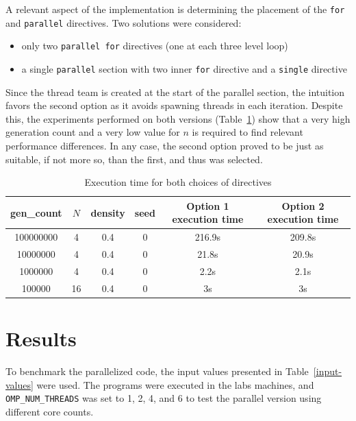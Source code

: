 \documentclass{article}
\begin{document}
A relevant aspect of the implementation is determining the placement of the \texttt{for} and 
\texttt{parallel} directives. Two solutions were considered:

\begin{itemize}
	\itemsep -0.2em
	\item only two \texttt{parallel for} directives (one at each three level
		loop)

	\item a single \texttt{parallel} section with two inner \texttt{for}
		directive and a \texttt{single} directive

\end{itemize}

Since the thread team is created at the start of the parallel section, the intuition
favors the second option as it avoids spawning threads in each iteration.
Despite this, the experiments performed on both versions
(Table~\ref{omp-directive-choice}) show that a very high generation count and a
very low value for $n$ is required to find relevant performance differences. 
In any case, the second option proved to be just as suitable, if not more so,
than the first, and thus was selected.

\begin{table}[h!]
	\centering
	\begin{tabular}{| c c c c c c||} 
	 \hline
	 gen\_count & $N$ & density & seed & Option 1 execution time & Option 2 execution time \\ [0.5ex] 
	 \hline\hline
	 100000000 & 4 & 0.4 & 0 & 216.9s & 209.8s \\ 
	 10000000 & 4 & 0.4 & 0 & 21.8s & 20.9s \\ 
	 1000000 & 4 & 0.4 & 0 & 2.2s & 2.1s\\
	 100000 & 16 & 0.4 & 0 & 3s & 3s\\ [1ex] 
	 \hline
	\end{tabular}
	\caption{Execution time for both choices of directives}
	\label{omp-directive-choice}
\end{table}

\section{Results}

To benchmark the parallelized code, the input values presented in Table~\ref{input-values}
were used. The programs were executed in the labs machines, and
\texttt{OMP\_NUM\_THREADS} was set to 1, 2, 4, and 6 to test the parallel version using
different core counts.
\end{document}
